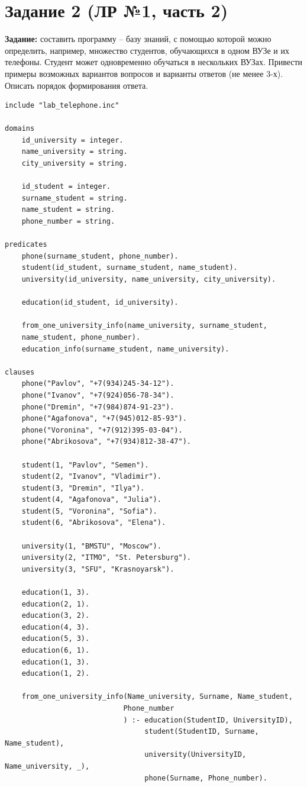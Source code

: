\section{Задание 2 (ЛР №1, часть 2)}
\textbf{Задание:} составить программу -- базу знаний, с помощью которой можно определить, например, множество студентов, обучающихся в одном ВУЗе и их телефоны. Студент может одновременно обучаться в нескольких ВУЗах. Привести примеры возможных вариантов вопросов и варианты ответов (не менее 3-х). Описать порядок формирования ответа.
\newpage
\begin{lstlisting}[basicstyle=\footnotesize]
include "lab_telephone.inc"

domains
	id_university = integer.
	name_university = string.
	city_university = string.
	
	id_student = integer.
	surname_student = string.
	name_student = string.
	phone_number = string.

predicates
	phone(surname_student, phone_number).
	student(id_student, surname_student, name_student).
	university(id_university, name_university, city_university).
	
	education(id_student, id_university).
	
	from_one_university_info(name_university, surname_student,
	name_student, phone_number).
	education_info(surname_student, name_university).

clauses
	phone("Pavlov", "+7(934)245-34-12").
	phone("Ivanov", "+7(924)056-78-34").
	phone("Dremin", "+7(984)874-91-23").
	phone("Agafonova", "+7(945)012-85-93").
	phone("Voronina", "+7(912)395-03-04").
	phone("Abrikosova", "+7(934)812-38-47").
	
	student(1, "Pavlov", "Semen").
	student(2, "Ivanov", "Vladimir").
	student(3, "Dremin", "Ilya").
	student(4, "Agafonova", "Julia").
	student(5, "Voronina", "Sofia").
	student(6, "Abrikosova", "Elena").
	
	university(1, "BMSTU", "Moscow").
	university(2, "ITMO", "St. Petersburg").
	university(3, "SFU", "Krasnoyarsk").

	education(1, 3).
	education(2, 1).
	education(3, 2).
	education(4, 3).
	education(5, 3).
	education(6, 1).
	education(1, 3).
	education(1, 2).

	from_one_university_info(Name_university, Surname, Name_student, 
							Phone_number
							) :- education(StudentID, UniversityID),
							     student(StudentID, Surname, Name_student),
							     university(UniversityID, Name_university, _),
								 phone(Surname, Phone_number).


\end{lstlisting}
